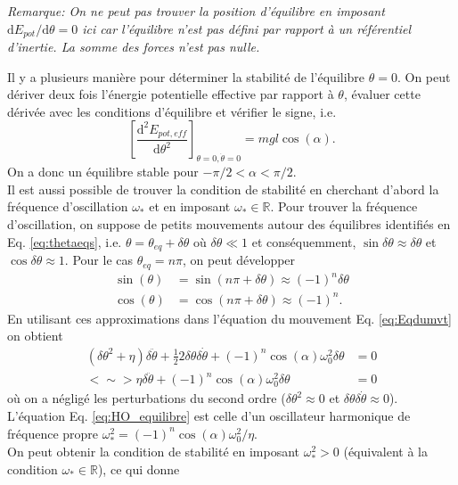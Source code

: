 \documentclass[11pt,a4paper]{exam}
\newcommand{\noteACDH}[1]{\textit{Remarque: #1}}
\begin{document}
\begin{parts}
    \noteACDH{On ne peut pas trouver la position d'équilibre en imposant $\mathrm d E_{pot}/\mathrm d\theta =0$ ici car l'équilibre n'est pas défini par rapport à un référentiel d'inertie. La somme des forces n'est pas nulle.}
    \par\vspace{2mm}
    Il y a plusieurs manière pour déterminer la stabilité de l'équilibre $\theta=0$.
    On peut dériver deux fois l'énergie potentielle effective par rapport à $\theta$, évaluer cette dérivée avec les conditions d'équilibre et vérifier le signe, i.e.
    $$
    \left[\frac{\mathrm d^2 E_{pot,eff}}{\mathrm d\theta^2}\right]_{\theta=0,\dot\theta=0} = mgl\cos(\alpha).
    $$
    On a donc un équilibre stable pour $-\pi/2<\alpha<\pi/2$.\\
    Il est aussi possible de trouver la condition de stabilité en cherchant d'abord la fréquence d'oscillation $\omega_*$ et en imposant $\omega_*\in\mathbb{R}$.
    Pour trouver la fréquence d'oscillation, on suppose de petits mouvements autour des équilibres identifiés en Eq. \eqref{eq:thetaeqs}, i.e. $\theta = \theta_{eq} +\delta\theta$ o\`u $\delta\theta \ll 1$ et conséquemment, $\sin\delta\theta\approx \delta\theta$ et $\cos\delta\theta \approx 1$.
    Pour le cas $\theta_{eq} = n\pi$, on peut développer
    \begin{align}
        \sin(\theta) &= \sin(n\pi+\delta\theta) \approx (-1)^n \delta\theta\\
        \cos(\theta) &= \cos(n\pi+\delta\theta) \approx (-1)^n .
    \end{align}
    En utilisant ces approximations dans l'équation du mouvement Eq. \eqref{eq:Eqdumvt} on obtient
    \begin{align}
    \left(\delta\theta^2+\eta\right)\delta\ddot \theta+ \frac{1}{2}2\delta\theta \delta\dot\theta + (-1)^n \cos(\alpha) \omega_0^2 \delta\theta &=0 \nonumber\\
        <\sim> \eta\delta\ddot\theta +(-1)^n \cos(\alpha)\omega_0^2 \delta\theta   &= 0
        \label{eq:HO_equilibre}
    \end{align}
    où on a négligé les perturbations du second ordre ($\delta\theta^2\approx 0$ et $\delta\theta\delta\dot\theta\approx 0$).
    L'équation Eq. \eqref{eq:HO_equilibre} est celle d'un oscillateur harmonique de fréquence propre $\omega_*^2=(-1)^n \cos(\alpha)\omega_0^2 /\eta$.\\
    On peut obtenir la condition de stabilité en imposant $\omega_*^2>0$ (équivalent à la condition $\omega_*\in\mathbb{R}$), ce qui donne

\end{parts}
\end{document}
